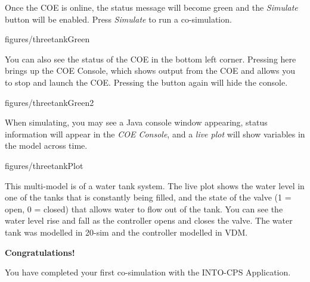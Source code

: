 \documentclass[11pt,a4paper]{../tutorial}
\begin{document}
\begin{instructions}
\item Once the COE is online, the status message will become green and the \emph{Simulate} button will be enabled. Press \emph{Simulate} to run a co-simulation.

    \begin{annotation}[width=0.85\linewidth,trim=0 0 0 0,clip]{figures/threetankGreen}
    \end{annotation}

    You can also see the status of the COE in the bottom left corner. Pressing here brings up the COE Console, which shows output from the COE and allows you to stop and launch the COE. Pressing the button again will hide the console.

    \begin{annotation}[width=0.85\linewidth,trim=0 0 0 240,clip]{figures/threetankGreen2}
    \end{annotation}

\newpage
\item When simulating, you may see a Java console window appearing, status information will appear in the \emph{COE Console}, and a \emph{live plot} will show variables in the model across time.

    \begin{annotation}[width=0.84\linewidth]{figures/threetankPlot}
    \end{annotation}

    This multi-model is of a water tank system. The live plot shows the water level in one of the tanks that is constantly being filled, and the state of the valve (1 = open, 0 = closed) that allows water to flow out of the tank. You can see the water level rise and fall as the controller opens and closes the valve. The water tank was modelled in 20-sim and the controller modelled in VDM.

    \bigskip
    \bigskip
    {\large\bfseries Congratulations!}

    You have completed your first co-simulation with the INTO-CPS Application.

\end{instructions}
\end{document}
